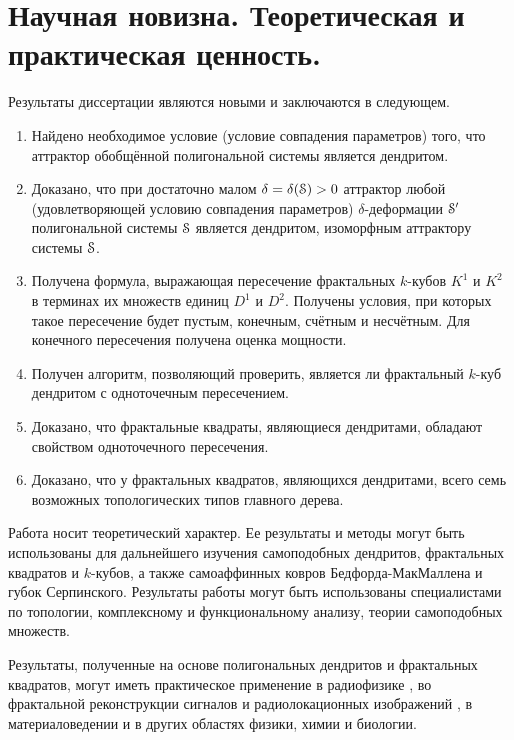 \section{Научная новизна. Теоретическая и практическая ценность.}
Результаты диссертации являются новыми и заключаются в следующем.
\begin{enumerate}
\item Найдено необходимое условие (условие совпадения параметров) того, что аттрактор обобщённой полигональной системы является дендритом. 

\item Доказано, что при достаточно малом $\delta=\delta({\EuScript S})>0$ аттрактор любой (удовлетворяющей условию совпадения параметров) $\delta$-деформации ${\EuScript S}'$  полигональной системы ${\EuScript S}$ является дендритом, изоморфным аттрактору системы ${\EuScript S}$.

\item Получена формула, выражающая пересечение фрактальных $k$-кубов $K^1$ и $K^2$ в терминах их множеств единиц $D^1$ и $D^2$.
Получены условия, при которых такое пересечение будет пустым, конечным, счётным и несчётным.
Для конечного пересечения получена оценка мощности.

\item Получен алгоритм, позволяющий проверить, является ли фрактальный $k$-куб дендритом с одноточечным пересечением.

\item Доказано, что фрактальные квадраты, являющиеся дендритами, обладают свойством одноточечного пересечения.

\item Доказано, что у фрактальных квадратов, являющихся дендритами, всего семь возможных топологических типов главного дерева.
\end{enumerate}

Работа носит теоретический характер. 
Ее результаты и методы могут быть использованы для дальнейшего изучения самоподобных дендритов, фрактальных квадратов и $k$-кубов, а также самоаффинных ковров Бедфорда-МакМаллена и губок Серпинского. 
Результаты работы могут быть использованы специалистами по топологии, комплексному и функциональному анализу, теории самоподобных множеств.

Результаты, полученные на основе полигональных дендритов и фрактальных квадратов, могут иметь практическое применение в радиофизике \cite{Pot2005, Pot2017}, во фрактальной реконструкции сигналов и радиолокационных изображений \cite{Pot2023, Pot2024}, в материаловедении \cite{Jana2017} и в других областях физики, химии и биологии.

